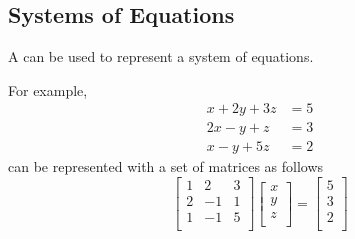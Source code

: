 \subsection{Systems of Equations}\label{subsec:Systems_Equations}
A  can be used to represent a system of equations.

For example,
\begin{align*}
  x + 2y + 3z &= 5 \\
  2x - y + z &= 3 \\
  x - y + 5z &= 2
\end{align*}
can be represented with a set of matrices as follows
\begin{equation*}
  \begin{bmatrix}
    1 & 2 & 3 \\
    2 & -1 & 1 \\
    1 & -1 & 5 \\
  \end{bmatrix}
  \begin{bmatrix}
    x \\
    y \\
    z \\
  \end{bmatrix}
  =
  \begin{bmatrix}
    5 \\
    3 \\
    2 \\
  \end{bmatrix}
\end{equation*}


